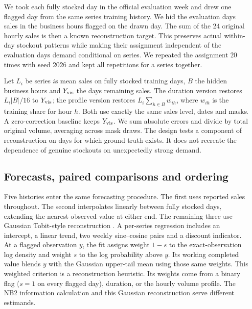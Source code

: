 \documentclass[11pt,a4paper]{article}
\begin{document}
We took each fully stocked day in the official evaluation week and drew one flagged day from the same series\textquotesingle{} training history. We hid the evaluation day\textquotesingle s sales in the business hours flagged on the drawn day. The sum of the 24 original hourly sales is then a known reconstruction target. This preserves actual within-day stockout patterns while making their assignment independent of the evaluation day\textquotesingle s demand conditional on series. We repeated the assignment 20 times with seed 2026 and kept all repetitions for a series together.

Let \(L_i\) be series \(i\)\textquotesingle s mean sales on fully stocked training days, \(B\) the hidden business hours and \(Y_{\rm vis}\) the day\textquotesingle s remaining sales. The duration version restores \(L_i|B|/16\) to \(Y_{\rm vis}\); the profile version restores \(L_i\sum_{h\in B}w_{ih}\), where \(w_{ih}\) is the training share for hour \(h\). Both use exactly the same sales level, dates and masks. A zero-correction baseline keeps \(Y_{\rm vis}\). We sum absolute errors and divide by total original volume, averaging across mask draws. The design tests a component of reconstruction on days for which ground truth exists. It does not recreate the dependence of genuine stockouts on unexpectedly strong demand.

\subsection{Forecasts, paired comparisons and ordering}

Five histories enter the same forecasting procedure. The first uses reported sales throughout. The second interpolates linearly between fully stocked days, extending the nearest observed value at either end. The remaining three use Gaussian Tobit-style reconstruction \cite{ref8}. A per-series regression includes an intercept, a linear trend, two weekly sine--cosine pairs and a discount indicator. At a flagged observation \(y\), the fit assigns weight \(1-s\) to the exact-observation log density and weight \(s\) to the log probability above \(y\). Its working completed value blends \(y\) with the Gaussian upper-tail mean using those same weights. This weighted criterion is a reconstruction heuristic. Its weights come from a binary flag (\(s=1\) on every flagged day), duration, or the hourly volume profile. The NB2 information calculation and this Gaussian reconstruction serve different estimands.
\end{document}
